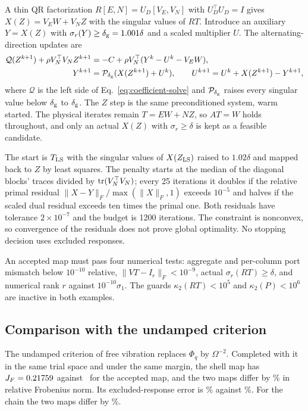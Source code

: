 A thin QR factorization $R[E,N]=U_D[V_E,V_N]$ with $U_D^{\top}U_D=I$ gives
$X(Z)=V_EW+V_NZ$ with the singular values of $RT$. Introduce an auxiliary
$Y=X(Z)$ with $\sigma_r(Y)\ge\delta_{\rm g}=1.001\delta$ and a scaled
multiplier $U$. The alternating-direction updates \citep{boyd2011} are
\begin{align}
 \mathcal Q(Z^{k+1})+\rho V_N^{\top}V_NZ^{k+1}
   &=-C+\rho V_N^{\top}(Y^k-U^k-V_EW),\nonumber\\
 Y^{k+1}&=\mathcal P_{\delta_{\rm g}}(X(Z^{k+1})+U^k),\qquad
 U^{k+1}=U^k+X(Z^{k+1})-Y^{k+1},
 \label{eq:admm}
\end{align}
where $\mathcal Q$ is the left side of Eq.~\eqref{eq:coefficient-solve}
and $\mathcal P_{\delta_{\rm g}}$ raises every singular value below
$\delta_{\rm g}$ to $\delta_{\rm g}$. The $Z$ step is the same
preconditioned system, warm started. The physical iterates remain
$T=EW+NZ$, so $AT=W$ holds throughout, and only an actual $X(Z)$ with
$\sigma_r\ge\delta$ is kept as a feasible candidate.

The start is $T_{\rm LS}$ with the singular values of $X(Z_{\rm LS})$
raised to $1.02\delta$ and mapped back to $Z$ by least squares. The penalty
starts at the median of the diagonal blocks' traces divided by
$\operatorname{tr}(V_N^{\top}V_N)$; every 25 iterations it doubles if the relative primal
residual $\|X-Y\|_F/\max(\|X\|_F,1)$ exceeds $10^{-5}$ and halves if the
scaled dual residual exceeds ten times the primal one. Both residuals have
tolerance $2\times10^{-7}$ and the budget is 1200 iterations. The
constraint is nonconvex, so convergence of the residuals does not prove
global optimality. No stopping decision uses excluded responses.

An accepted map must pass four numerical tests: aggregate and per-column
port mismatch below $10^{-10}$ relative, $\|VT-I_r\|_F<10^{-9}$, actual
$\sigma_r(RT)\ge\delta$, and numerical rank $r$ against
$10^{-10}\sigma_1$. The guards $\kappa_2(RT)<10^5$ and $\kappa_2(P)<10^6$
are inactive in both examples.

\subsection{Comparison with the undamped criterion}\label{sec:completion-benchmark}
The undamped criterion of free vibration replaces $\Phi_q$ by $\Omega^{-2}$.
Completed with it in the same trial space and under the same margin, the
shell map has $J_F=0.21759$ against \LabJF\ for the accepted map, and
the two maps differ by \LabMapChange\% in relative Frobenius norm. Its
excluded-response error is \LabExcludedErrorJZero\% against
\LabExcludedError\%. For the chain the two maps differ by \SpringMapChange\%.

